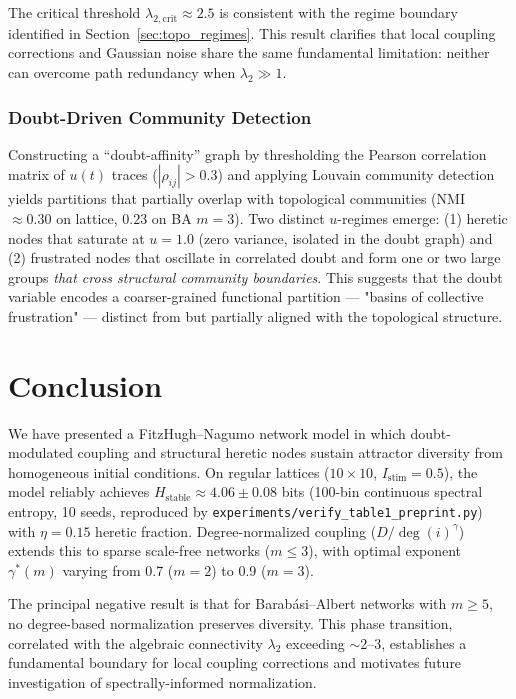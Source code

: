 \documentclass[11pt]{article}
\begin{document}
The critical threshold $\lambda_{2,\mathrm{crit}} \approx 2.5$ is consistent with the regime boundary identified in Section~\ref{sec:topo_regimes}. This result clarifies that local coupling corrections and Gaussian noise share the same fundamental limitation: neither can overcome path redundancy when $\lambda_2 \gg 1$.

\subsubsection*{Doubt-Driven Community Detection}

Constructing a ``doubt-affinity'' graph by thresholding the Pearson correlation matrix of $u(t)$ traces ($|\rho_{ij}| > 0.3$) and applying Louvain community detection yields partitions that partially overlap with topological communities (NMI $\approx 0.30$ on lattice, $0.23$ on BA $m=3$). Two distinct $u$-regimes emerge: (1) heretic nodes that saturate at $u=1.0$ (zero variance, isolated in the doubt graph) and (2) frustrated nodes that oscillate in correlated doubt and form one or two large groups \emph{that cross structural community boundaries}. This suggests that the doubt variable encodes a coarser-grained functional partition — "basins of collective frustration" — distinct from but partially aligned with the topological structure.

\section{Conclusion}

We have presented a FitzHugh--Nagumo network model in which doubt-modulated coupling and structural heretic nodes sustain attractor diversity from homogeneous initial conditions. On regular lattices ($10\times10$, $I_{\text{stim}}=0.5$), the model reliably achieves $H_{\text{stable}} \approx 4.06 \pm 0.08$ bits (100-bin continuous spectral entropy, 10 seeds, reproduced by \texttt{experiments/verify\_table1\_preprint.py}) with $\eta = 0.15$ heretic fraction. Degree-normalized coupling ($D/\deg(i)^\gamma$) extends this to sparse scale-free networks ($m \leq 3$), with optimal exponent $\gamma^*(m)$ varying from 0.7 ($m = 2$) to 0.9 ($m = 3$).

The principal negative result is that for Barab\'asi--Albert networks with $m \geq 5$, no degree-based normalization preserves diversity. This phase transition, correlated with the algebraic connectivity $\lambda_2$ exceeding $\sim$2--3, establishes a fundamental boundary for local coupling corrections and motivates future investigation of spectrally-informed normalization.
\end{document}
